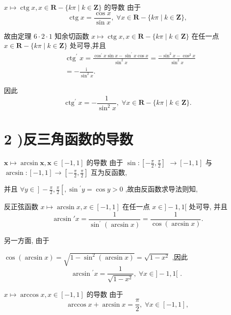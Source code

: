 $x \mapsto  \operatorname{ctg}x,x \in  \mathbf{R} - \{ {k\pi } \mid  k \in  \mathbf{Z}\}$ 的导数 由于
$$\operatorname{ctg}x = \frac{\cos x}{\sin x},\;\forall x \in  \mathbf{R} - \{ {k\pi } \mid  k \in  \mathbf{Z}\} ,$$

故由定理 $6 \cdot  2 \cdot  1$ 知余切函数 $x \mapsto  \operatorname{ctg}x,x \in  \mathbf{R} - \{ {k\pi } \mid  k \in  \mathbf{Z}\}$ 在任一点 $x \in  \mathbf{R} - \{ {k\pi } \mid  k \in  \mathbf{Z}\}$ 处可导,并且
\begin{align*}
	&{\operatorname{ctg}}^{\prime }x = \frac{{\cos }^{\prime }x\sin x - {\sin }^{\prime }x\cos x}{{\sin }^{2}x} = \frac{-{\sin }^{2}x - {\cos }^{2}x}{{\sin }^{2}x}\\
	&=  - \frac{\mathrm{i}}{{\sin }^{2}x}.
\end{align*}

因此
$${\operatorname{ctg}}^{\prime }x =  - \frac{1}{{\sin }^{2}x},\;\forall x \in  \mathbf{R} - \{ {k\pi } \mid  k \in  \mathbf{Z}\} .$$

\section*{2 )反三角函数的导数}

$\mathbf{x} \mapsto  \arcsin \mathbf{x},\mathbf{x} \in  \left\lbrack  {-1,1}\right\rbrack$ 的导数 由于 $\sin  : \left\lbrack  {-\frac{\pi }{2},\frac{\pi }{2}}\right\rbrack$  $\rightarrow  \left\lbrack  {-1,1}\right\rbrack$ 与 $\arcsin  : \left\lbrack  {-1,1}\right\rbrack   \rightarrow  \left\lbrack  {-\frac{\pi }{2},\frac{\pi }{2}}\right\rbrack$ 互为反函数,

并且 $\left. {\forall y \in  }\right\rbrack   - \frac{\pi }{2},\frac{\pi }{2}\left\lbrack  {,\sin {}^{\prime }y = \cos y > 0}\right.$ ,故由反函数求导法则知,

反正弦函数 $x \mapsto  \arcsin x,x \in  \left\lbrack  {-1,1}\right\rbrack$ 在任一点 $x \in  \rbrack  - 1,1\lbrack$ 处可导, 并且
$$\arcsin \prime x = \frac{1}{{\sin }^{\prime }\left( {\arcsin x}\right) } = \frac{1}{\cos \left( {\arcsin x}\right) }.$$

另一方面, 由于

$\cos \left( {\arcsin x}\right)  = \sqrt{1 - {\sin }^{2}\left( {\arcsin x}\right) } = \sqrt{1 - {x}^{2}}$ ,因此
$$\arcsin {}^{\prime }x = \frac{1}{\sqrt{1 - {x}^{2}}},\;\forall x \in  \rbrack  - 1,1\lbrack \text{ . }$$

$x \mapsto  \arccos x,x \in  \left\lbrack  {-1,1}\right\rbrack$ 的导数 由于
$$\arccos x + \arcsin x = \frac{\pi }{2},\;\forall x \in  \left\lbrack  {-1,1}\right\rbrack  ,$$

